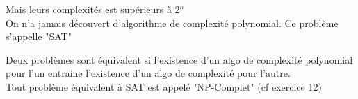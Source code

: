 Mais leurs complexités est supérieurs à $2^n$\\

On n'a jamais découvert d'algorithme de complexité polynomial. Ce problème s'appelle "SAT"

Deux problèmes sont équivalent si l'existence d'un algo de complexité polynomial pour l'un entraine l'existence d'un algo de complexité pour l'autre.\\

Tout problème équivalent à SAT est appelé "NP-Complet" (cf exercice 12)
















